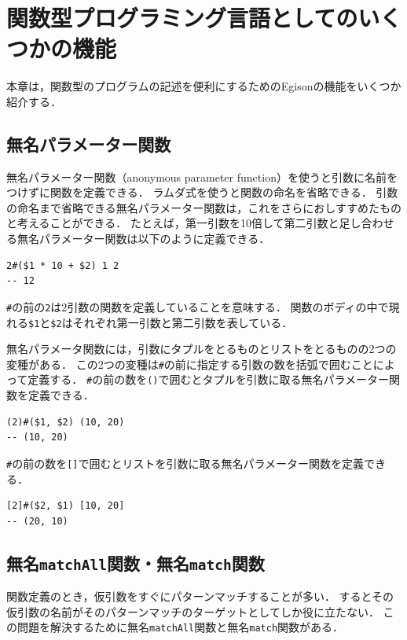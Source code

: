 \chapter{関数型プログラミング言語としてのいくつかの機能}\label{etc}

本章は，関数型のプログラムの記述を便利にするためのEgisonの機能をいくつか紹介する．

\section{無名パラメーター関数}

無名パラメーター関数（anonymous parameter function）を使うと引数に名前をつけずに関数を定義できる．
ラムダ式を使うと関数の命名を省略できる．
引数の命名まで省略できる無名パラメーター関数は，これをさらにおしすすめたものと考えることができる．
たとえば，第一引数を10倍して第二引数と足し合わせる無名パラメーター関数は以下のように定義できる．
\begin{lstlisting}[language=egison,numbers=none]
2#($1 * 10 + $2) 1 2
-- 12
\end{lstlisting}
\lstinline{#}の前の\lstinline{2}は$2$引数の関数を定義していることを意味する．
関数のボディの中で現れる\lstinline{$1}と\lstinline{$2}はそれぞれ第一引数と第二引数を表している．

無名パラメータ関数には，引数にタプルをとるものとリストをとるものの2つの変種がある．
この2つの変種は\lstinline{#}の前に指定する引数の数を括弧で囲むことによって定義する．
\lstinline{#}の前の数を\lstinline{()}で囲むとタプルを引数に取る無名パラメーター関数を定義できる．
\begin{lstlisting}[language=egison,numbers=none]
(2)#($1, $2) (10, 20)
-- (10, 20)
\end{lstlisting}
\lstinline{#}の前の数を\lstinline{[]}で囲むとリストを引数に取る無名パラメーター関数を定義できる．
\begin{lstlisting}[language=egison,numbers=none]
[2]#($2, $1) [10, 20]
-- (20, 10)
\end{lstlisting}

\section{無名\texttt{matchAll}関数・無名\texttt{match}関数}

関数定義のとき，仮引数をすぐにパターンマッチすることが多い．
するとその仮引数の名前がそのパターンマッチのターゲットとしてしか役に立たない．
この問題を解決するために無名\lstinline{matchAll}関数と無名\lstinline{match}関数がある．

